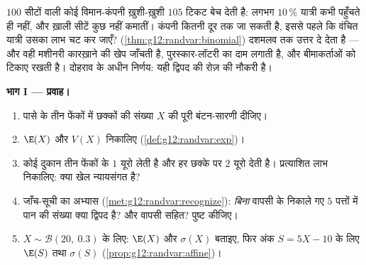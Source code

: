 \begin{problem}
\label{pb:g12:randvar:1}
$100$ सीटों वाली कोई विमान-कंपनी ख़ुशी-ख़ुशी $105$ टिकट बेच देती है: लगभग
$10\,\%$ यात्री कभी पहुँचते ही नहीं, और ख़ाली सीटें कुछ नहीं कमातीं। कंपनी कितनी
दूर तक जा सकती है, इससे पहले कि वंचित यात्री उसका लाभ चट कर जाएँ? 
(\cref{thm:g12:randvar:binomial}) दशमलव तक उत्तर दे देता है --- और वही मशीनरी कारख़ाने की खेप जाँचती
है, पुरस्कार-लॉटरी का दाम लगाती है, और बीमाकर्ताओं को टिकाए रखती है। दोहराव
के अधीन निर्णय: यही द्विपद की रोज़ की नौकरी है।

\medskip
\noindent\textbf{भाग I --- प्रवाह।}
\begin{enumerate}
  \item पासे के तीन फेंकों में छक्कों की संख्या $X$ की पूरी बंटन-सारणी
        दीजिए।
  \item $\E(X)$ और $V(X)$ निकालिए (\cref{def:g12:randvar:exp})।
  \item कोई दुकान तीन फेंकों के $1$ यूरो लेती है और हर छक्के पर $2$ यूरो
        देती है। प्रत्याशित लाभ निकालिए: क्या खेल न्यायसंगत है?
  \item जाँच-सूची का अभ्यास (\cref{met:g12:randvar:recognize}): \emph{बिना} वापसी के निकाले गए $5$
        पत्तों में पान की संख्या क्या द्विपद है? और वापसी सहित? पुष्ट कीजिए।
  \item $X \sim \mathcal B(20,\ 0.3)$ के लिए: $\E(X)$ और $\sigma(X)$ बताइए, फिर अंक $S = 5X - 10$ के लिए $\E(S)$ तथा
        $\sigma(S)$ (\cref{prop:g12:randvar:affine})।
\end{enumerate}


\end{problem}
